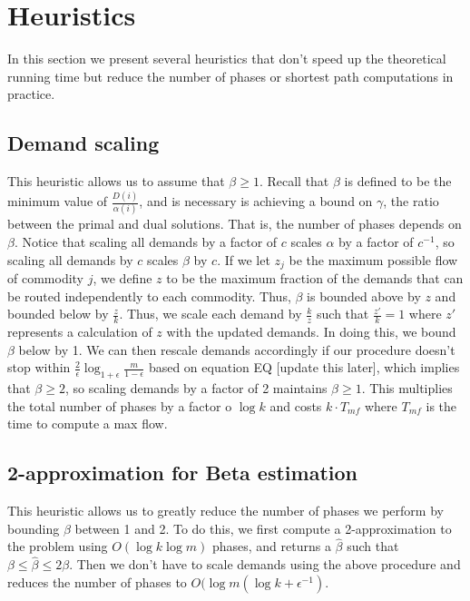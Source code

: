 \section{Heuristics}
In this section we present several heuristics that don't speed up the
theoretical running time but reduce the number of phases or shortest
path computations in practice.
\subsection{Demand scaling}
This heuristic allows us to assume that $\beta\geq 1$. Recall that
$\beta$ is defined to be the minimum value of
$\frac{D(i)}{\alpha(i)}$, and is necessary is achieving a bound on
$\gamma$, the ratio between the primal and dual solutions. That is,
the number of phases depends on $\beta$. Notice that scaling all
demands by a factor of $c$ scales $\alpha$ by a factor of $c^{-1}$, so
scaling all demands by $c$ scales $\beta$ by $c$. If we let $z_j$ be
the maximum possible flow of commodity $j$, we define $z$ to be the
maximum fraction of the demands that can be routed independently to
each commodity. Thus, $\beta$ is bounded above by $z$ and bounded
below by $\frac{z}{k}$. Thus, we scale each demand by $\frac{k}{z}$
such that $\frac{z'}{k} =1$ where $z'$ represents a calculation of $z$
with the updated demands. In doing this, we bound $\beta$ below by
1. We can then rescale demands accordingly if our procedure doesn't
stop within $\frac{2}{\epsilon}\log_{1+\epsilon}\frac{m}{1-\epsilon}$
based on equation EQ [update this later], which implies that
$\beta\geq 2$, so scaling demands by a factor of 2 maintains
$\beta\geq 1$. This multiplies the total number of phases by a factor
o $\log k$ and costs $k\cdot T_{mf}$ where $T_{mf}$ is the time to
compute a max flow.
\subsection{2-approximation for Beta estimation}
This heuristic allows us to greatly reduce the number of phases we
perform by bounding $\beta$ between 1 and 2. To do this, we first
compute a 2-approximation to the problem using $O(\log k \log m)$
phases, and returns a $\hat{\beta}$ such that $\beta\leq \hat{\beta}\leq2\beta$. Then we don't have to scale demands using the above procedure
and reduces the number of phases to $O(\log m(\log k+\epsilon^{-1})$.

